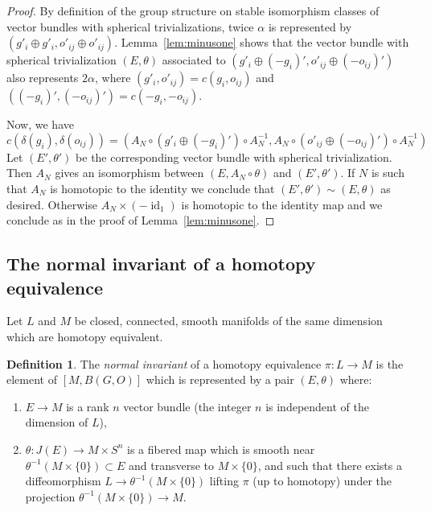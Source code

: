 \documentclass[reqno]{amsart}
\theoremstyle{theorem}
\theoremstyle{remark}
\theoremstyle{definition}
\newtheorem{definition}[corollary]{Definition}
\DeclareMathOperator{\id}{id}
\begin{document}
\begin{proof}


By definition of the group structure on stable isomorphism classes of vector bundles with spherical trivializations, twice $\alpha$ is represented by $(g'_i \oplus g'_i,o'_{ij} \oplus o'_{ij})$. Lemma~\ref{lem:minusone} shows that the vector bundle with spherical trivialization $(E,\theta)$
associated to $(g'_i \oplus (-g_i)',o'_{ij} \oplus (-o_{ij})')$ also represents $2\alpha$, where $(g'_i,o'_{ij})=c(g_i,o_{ij})$ and $((-g_i)',(-o_{ij})')=c(-g_i,-o_{ij})$.


Now, we have 
\[c(\delta(g_i),\delta(o_{ij}))=(A_N\circ (g'_i \oplus (-g_i)')\circ A_N^{-1}, A_N\circ (o'_{ij} \oplus (-o_{ij})') \circ A_N^{-1})\]
 Let $(E',\theta')$ be the corresponding vector bundle with spherical trivialization.  Then $A_N$ gives an isomorphism between  $(E,A_N \circ \theta)$
and $(E', \theta')$. If $N$ is such that $A_N$ is homotopic to the identity we conclude that $(E',\theta') \sim (E,\theta)$ as desired. Otherwise $A_N\times (-\id_1)$
is homotopic to the identity map and we conclude as in the proof of Lemma~\ref{lem:minusone}.\end{proof}








\subsection{The normal invariant of a homotopy equivalence}


Let $L$ and $M$ be closed, connected, smooth manifolds of the same dimension which are homotopy equivalent.


\begin{definition}\label{def:normalinvt}
The \emph{normal invariant} of a homotopy equivalence $\pi: L \to M$ is the element of $[M,B(G,O)]$ which is represented
by a pair $(E,\theta)$ where:
\begin{enumerate}
\item $E \to M$ is a rank $n$ vector bundle (the integer $n$ is independent of the dimension of $L$),
\item $\theta : J(E) \to M\times S^n$ is a fibered map which is smooth near $\theta^{-1}(M\times \{0\})\subset E$
and transverse to $M\times\{0\}$, and such that there exists a diffeomorphism $L\to \theta^{-1}(M\times\{0\})$ lifting $\pi$
(up to homotopy) under the projection $\theta^{-1}(M\times\{0\})\to M$.
\end{enumerate}
\end{definition}
\end{document}
